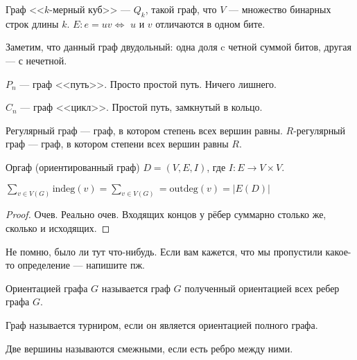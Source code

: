\begin{definition}
	Граф <<$k$-мерный куб>> --- $Q_k$, такой граф, что $V$ --- множество бинарных строк длины  $k$.  $E: e = uv \iff$ $u$ и  $v$ отличаются в одном бите. 
\end{definition}
\begin{remark}
    Заметим, что данный граф двудольный: одна доля c четной суммой битов, другая --- с нечетной.
\end{remark}
\begin{definition}
    $P_n$ --- граф <<путь>>. Просто простой путь. Ничего лишнего.
\end{definition}
\begin{definition}
    $C_n$ --- граф <<цикл>>. Простой путь, замкнутый в кольцо.
\end{definition}
\begin{definition}
    Регулярный граф --- граф, в котором степень всех вершин равны. $R$-регулярный граф --- граф, в котором степени всех вершин равны $R$.
\end{definition}
\begin{definition}
    Оргаф (ориентированный граф) $D = (V, E, I)$, где $I: E \to V \times V$.
\end{definition}
\begin{theorem}
    $\displaystyle \sum_{v \in V(G)} \text{indeg}(v) = \sum_{v \in V(G)} = \text{outdeg}(v) = |E(D)|$
\end{theorem}
\begin{proof}
    Очев. Реально очев. Входящих концов у рёбер суммарно столько же, сколько и исходящих.
\end{proof}
\begin{definition}
    Не помню, было ли тут что-нибудь. Если вам кажется, что мы пропустили какое-то определение --- напишите пж.
\end{definition}
\begin{definition}
    Ориентацией графа $G$ называется граф $G$ полученный ориентацией всех ребер графа $G$.
\end{definition}
\begin{definition}
    Граф называется турниром, если он является ориентацией полного графа.
\end{definition}
\begin{definition}
    Две вершины называются смежными, если есть ребро между ними.
\end{definition}

